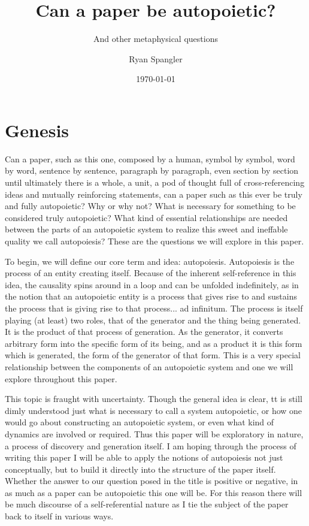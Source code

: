 \documentclass[12pt]{scrartcl}
\title{Can a paper be autopoietic?}
\subtitle{And other metaphysical questions}
\author{Ryan Spangler}
\date{\today}
\begin{document}
\maketitle

\section{Genesis}

Can a paper, such as this one, composed by a human, symbol by symbol, word by word, sentence by sentence, paragraph by paragraph, even section by section until ultimately there is a whole, a unit, a pod of thought full of cross-referencing ideas and mutually reinforcing statements, can a paper such as this ever be truly and fully autopoietic?  Why or why not?  What is necessary for something to be considered truly autopoietic?  What kind of essential relationships are needed between the parts of an autopoietic system to realize this sweet and ineffable quality we call autopoiesis?  These are the questions we will explore in this paper.  

To begin, we will define our core term and idea: autopoiesis.  Autopoiesis is the process of an entity creating itself.  Because of the inherent self-reference in this idea, the causality spins around in a loop and can be unfolded indefinitely, as in the notion that an autopoietic entity is a process that gives rise to and sustains the process that is giving rise to that process... ad infinitum.  The process is itself playing (at least) two roles, that of the generator and the thing being generated.  It is the product of that process of generation.  As the generator, it converts arbitrary form into the specific form of its being, and as a product it is this form which is generated, the form of the generator of that form.  This is a very special relationship between the components of an autopoietic system and one we will explore throughout this paper.  

This topic is fraught with uncertainty.  Though the general idea is clear, tt is still dimly understood just what is necessary to call a system autopoietic, or how one would go about constructing an autopoietic system, or even what kind of dynamics are involved or required.  Thus this paper will be exploratory in nature, a process of discovery and generation itself.  I am hoping through the process of writing this paper I will be able to apply the notions of autopoiesis not just conceptually, but to build it directly into the structure of the paper itself.  Whether the answer to our question posed in the title is positive or negative, in as much as a paper can be autopoietic this one will be.  For this reason there will be much discourse of a self-referential nature as I tie the subject of the paper back to itself in various ways.  
\end{document}
